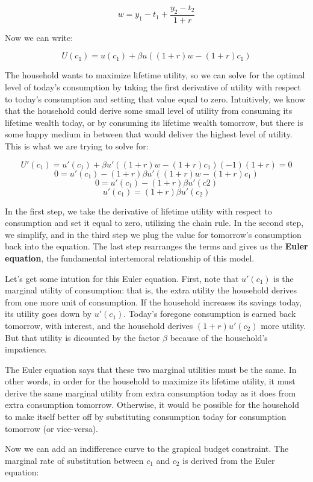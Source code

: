 \documentclass[12pt]{article}
\begin{document}
\[ w = y_1 - t_1 + \frac{y_2-t_2}{1+r} \]

Now we can write:

\[ U(c_1) = u(c_1) + \beta u((1+r)w-(1+r)c_1) \]

The household wants to maximize lifetime utility, so we can solve for the optimal level of today's consumption by taking the first derivative of utility with respect to today's consumption and setting that value equal to zero. Intuitively, we know that the household could derive some small level of utility from consuming its lifetime wealth today, or by consuming its lifetime wealth tomorrow, but there is some happy medium in between that would deliver the highest level of utility. This is what we are trying to solve for:

\[ U'(c_1) = u'(c_1) + \beta u'((1+r)w-(1+r)c_1)(-1)(1+r) = 0 \]
\[ 0 = u'(c_1) - (1+r) \beta u'((1+r)w-(1+r)c_1) \]
\[ 0 = u'(c_1) - (1+r) \beta u'(c2) \]
\[ u'(c_1) = (1+r) \beta u'(c_2) \]

In the first step, we take the derivative of lifetime utility with respect to consumption and set it equal to zero, utilizing the chain rule. In the second step, we simplify, and in the third step we plug the value for tomorrow's consumption back into the equation. The last step rearranges the terms and gives us the \textbf{Euler equation}, the fundamental intertemoral relationship of this model.

Let's get some intution for this Euler equation. First, note that \(u'(c_1)\) is the marginal utility of consumption: that is, the extra utility the household derives from one more unit of consumption. If the household increases its savings today, its utility goes down by \(u'(c_1)\). Today's foregone consumption is earned back tomorrow, with interest, and the household derives \((1+r)u'(c_2)\) more utility. But that utility is dicounted by the factor \(\beta\) because of the household's impatience. 

The Euler equation says that these two marginal utilities must be the same. In other words, in order for the household to maximize its lifetime utility, it must derive the same marginal utility from extra consumption today as it does from extra consumption tomorrow. Otherwise, it would be possible for the household to make itself better off by substituting consumption today for consumption tomorrow (or vice-versa).

Now we can add an indifference curve to the grapical budget constraint. The marginal rate of substitution between \(c_1\) and \(c_2\) is derived from the Euler equation:
\end{document}
